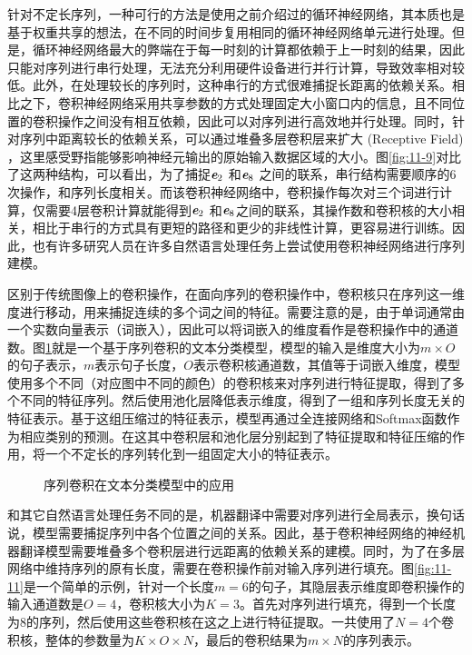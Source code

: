 \parinterval 针对不定长序列，一种可行的方法是使用之前介绍过的循环神经网络，其本质也是基于权重共享的想法，在不同的时间步复用相同的循环神经网络单元进行处理。但是，循环神经网络最大的弊端在于每一时刻的计算都依赖于上一时刻的结果，因此只能对序列进行串行处理，无法充分利用硬件设备进行并行计算，导致效率相对较低。此外，在处理较长的序列时，这种串行的方式很难捕捉长距离的依赖关系。相比之下，卷积神经网络采用共享参数的方式处理固定大小窗口内的信息，且不同位置的卷积操作之间没有相互依赖，因此可以对序列进行高效地并行处理。同时，针对序列中距离较长的依赖关系，可以通过堆叠多层卷积层来扩大{\small{}} (Receptive Field)  ，这里感受野指能够影响神经元输出的原始输入数据区域的大小。图\ref{fig:11-9}对比了这两种结构，可以看出，为了捕捉$\textbf{\em e}_2$ 和$\textbf{\em e}_8$ 之间的联系，串行结构需要顺序的6次操作，和序列长度相关。而该卷积神经网络中，卷积操作每次对三个词进行计算，仅需要4层卷积计算就能得到$\textbf{\em e}_2$ 和$\textbf{\em e}_8$之间的联系，其操作数和卷积核的大小相关，相比于串行的方式具有更短的路径和更少的非线性计算，更容易进行训练。因此，也有许多研究人员在许多自然语言处理任务上尝试使用卷积神经网络进行序列建模。

\parinterval 区别于传统图像上的卷积操作，在面向序列的卷积操作中，卷积核只在序列这一维度进行移动，用来捕捉连续的多个词之间的特征。需要注意的是，由于单词通常由一个实数向量表示（词嵌入），因此可以将词嵌入的维度看作是卷积操作中的通道数。图\ref{fig:11-10}就是一个基于序列卷积的文本分类模型，模型的输入是维度大小为$m\times O $的句子表示，$m$表示句子长度，$O$表示卷积核通道数，其值等于词嵌入维度，模型使用多个不同（对应图中不同的颜色）的卷积核来对序列进行特征提取，得到了多个不同的特征序列。然后使用池化层降低表示维度，得到了一组和序列长度无关的特征表示。基于这组压缩过的特征表示，模型再通过全连接网络和Softmax函数作为相应类别的预测。在这其中卷积层和池化层分别起到了特征提取和特征压缩的作用，将一个不定长的序列转化到一组固定大小的特征表示。

\begin{figure}[htp]
\centering

\caption{序列卷积在文本分类模型中的应用}
\label{fig:11-10}
\end{figure}

\parinterval 和其它自然语言处理任务不同的是，机器翻译中需要对序列进行全局表示，换句话说，模型需要捕捉序列中各个位置之间的关系。因此，基于卷积神经网络的神经机器翻译模型需要堆叠多个卷积层进行远距离的依赖关系的建模。同时，为了在多层网络中维持序列的原有长度，需要在卷积操作前对输入序列进行填充。图\ref{fig:11-11}是一个简单的示例，针对一个长度$m=6$的句子，其隐层表示维度即卷积操作的输入通道数是$O=4$，卷积核大小为$K=3$。首先对序列进行填充，得到一个长度为8的序列，然后使用这些卷积核在这之上进行特征提取。一共使用了$N=4$个卷积核，整体的参数量为$K \times O \times N$，最后的卷积结果为$m \times N$的序列表示。

